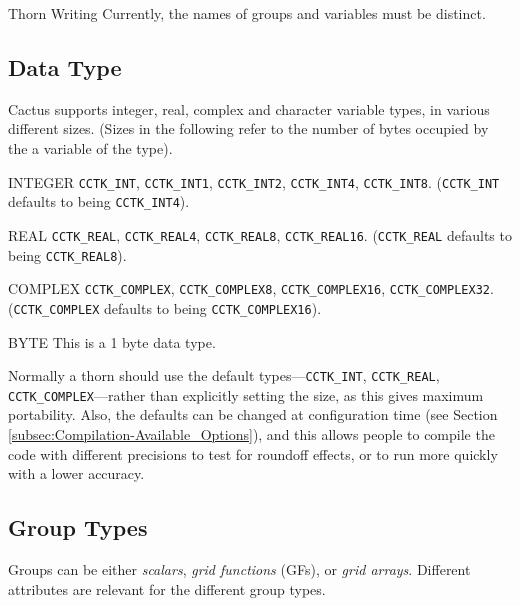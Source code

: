 \begin{cactuspart}{Thorn Writing}
Currently, the names of groups and variables must be distinct.


\subsection{Data Type}

Cactus supports integer, real, complex and character variable types, in
various different sizes.  (Sizes in the following refer to the number of
bytes occupied by the a variable of the type).

\begin{Lentry}
\item[INTEGER]
\texttt{CCTK\_INT}, \texttt{CCTK\_INT1}, \texttt{CCTK\_INT2}, \texttt{CCTK\_INT4}, \texttt{CCTK\_INT8}.
(\texttt{CCTK\_INT} defaults to being \texttt{CCTK\_INT4}).
\item[REAL]
\texttt{CCTK\_REAL}, \texttt{CCTK\_REAL4}, \texttt{CCTK\_REAL8}, \texttt{CCTK\_REAL16}.  (\texttt{CCTK\_REAL} defaults to being \texttt{CCTK\_REAL8}).
\item[COMPLEX]
\texttt{CCTK\_COMPLEX}, \texttt{CCTK\_COMPLEX8}, \texttt{CCTK\_COMPLEX16}, \texttt{CCTK\_COMPLEX32}.
(\texttt{CCTK\_COMPLEX} defaults to being \texttt{CCTK\_COMPLEX16}).
\item[BYTE]
This is a 1 byte data type.
\end{Lentry}

Normally a thorn should use the default types---\texttt{CCTK\_INT}, \texttt{CCTK\_REAL}, \texttt{CCTK\_COMPLEX}---rather than explicitly setting the size, as this gives maximum
portability. Also, the defaults can be changed at configuration time (see Section
\ref{subsec:Compilation-Available_Options}), and this allows people to compile the
code with different precisions to test for roundoff effects, or to run more
quickly with a lower accuracy.


\subsection{Group Types}
\label{sec:cactus_variables-groups}

Groups can be either \textit{scalars}, \textit{grid functions} (GFs), or
\textit{grid arrays}. Different attributes are relevant for the different group
types.



\end{cactuspart}
